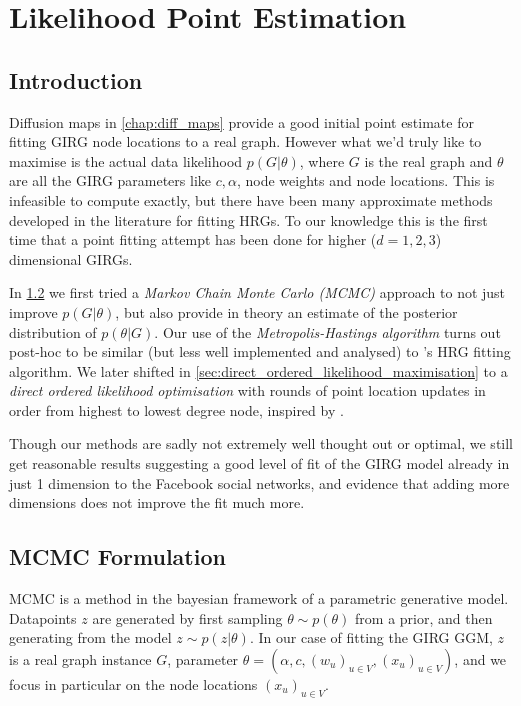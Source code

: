 \chapter{Likelihood Point Estimation}
\label{chap:likelihood_point_estimation}
\minitoc
\section{Introduction}
Diffusion maps in \cref{chap:diff_maps} provide a good initial point estimate for fitting GIRG node locations to a real graph. However what we'd truly like to maximise is the actual data likelihood $p(G | \theta)$, where $G$ is the real graph and $\theta$ are all the GIRG parameters like $c, \alpha$, node weights and node locations. This is infeasible to compute exactly, but there have been many approximate methods developed in the literature for fitting HRGs. To our knowledge this is the first time that a point fitting attempt has been done for higher ($d=1,2,3$) dimensional GIRGs.




In \cref{sec:mcmc_formulation} we first tried a \textit{Markov Chain Monte Carlo (MCMC)} approach to not just improve $p(G | \theta)$, but also provide in theory an estimate of the posterior distribution of $p(\theta | G)$. Our use of the \textit{Metropolis-Hastings algorithm} turns out post-hoc to be similar (but less well implemented and analysed) to \cite{boguna2010sustaining}'s HRG fitting algorithm. We later shifted in \cref{sec:direct_ordered_likelihood_maximisation} to a \textit{direct ordered likelihood optimisation} with rounds of point location updates in order from highest to lowest degree node, inspired by \cite{garcia2019mercator}.


Though our methods are sadly not extremely well thought out or optimal, we still get reasonable results suggesting a good level of fit of the GIRG model already in just 1 dimension to the Facebook social networks, and evidence that adding more dimensions does not improve the fit much more.

\section{MCMC Formulation}
\label{sec:mcmc_formulation}
MCMC is a method in the bayesian framework of a parametric generative model. Datapoints $z$ are generated by first sampling $\theta \sim p(\theta)$ from a prior, and then generating from the model $z \sim p(z | \theta)$. In our case of fitting the GIRG GGM, $z$ is a real graph instance $G$, parameter $\theta = (\alpha, c, (w_u)_{u \in V}, (x_u)_{u \in V})$, and we focus in particular on the node locations $(x_u)_{u \in V}$.

